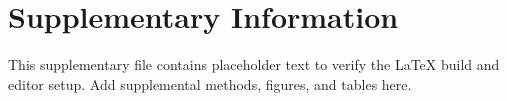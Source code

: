 \section*{Supplementary Information}

This supplementary file contains placeholder text to verify the LaTeX build and editor setup.
Add supplemental methods, figures, and tables here.

